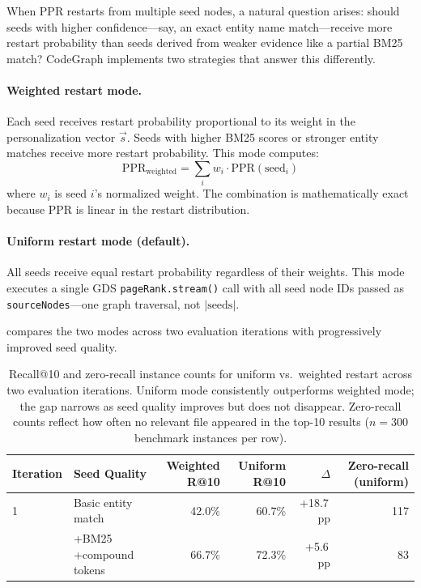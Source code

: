 When PPR restarts from multiple seed nodes, a natural question arises: should seeds with higher confidence---say, an exact entity name match---receive more restart probability than seeds derived from weaker evidence like a partial BM25 match? CodeGraph implements two strategies that answer this differently.

\paragraph{Weighted restart mode.} Each seed receives restart probability proportional to its weight in the personalization vector $\vec{s}$. Seeds with higher BM25 scores or stronger entity matches receive more restart probability. This mode computes:
\begin{equation}
    \text{PPR}_{\text{weighted}} = \sum_i w_i \cdot \text{PPR}(\text{seed}_i)
    \label{eq:weighted-ppr}
\end{equation}
where $w_i$ is seed $i$'s normalized weight. The combination is mathematically exact because PPR is linear in the restart distribution.

\paragraph{Uniform restart mode (default).} All seeds receive equal restart probability regardless of their weights. This mode executes a single GDS \texttt{pageRank.stream()} call with all seed node IDs passed as \texttt{sourceNodes}---one graph traversal, not $|\text{seeds}|$.

 compares the two modes across two evaluation iterations with progressively improved seed quality.

\begin{table}[H]
    \centering
    \caption[Uniform vs.\ weighted restart mode comparison]{Recall@10 and zero-recall instance counts for uniform vs.\ weighted restart across two evaluation iterations. Uniform mode consistently outperforms weighted mode; the gap narrows as seed quality improves but does not disappear. Zero-recall counts reflect how often no relevant file appeared in the top-10 results ($n = 300$ benchmark instances per row).}
    \label{tab:restart-modes}
    \begin{tabularx}{\textwidth}{l X r r r r}
        \toprule
        \textbf{Iteration} & \textbf{Seed Quality} & \textbf{Weighted R@10} & \textbf{Uniform R@10} & \textbf{$\Delta$} & \textbf{Zero-recall (uniform)} \\
        \midrule
        1 & Basic entity match & 42.0\% & 60.7\% & +18.7\,pp & 117 \\
        \addlinespace[3pt]
        2 & +BM25 +compound tokens & 66.7\% & 72.3\% & +5.6\,pp & 83 \\
        \bottomrule
    \end{tabularx}
\end{table}

